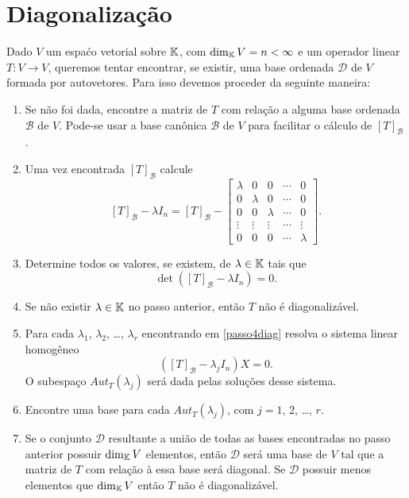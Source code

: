 \section{Diagonaliza\c{c}ão}
Dado $V$ um espaćo vetorial sobre $\mathbb{K}$, com $\dim_{\mathbb{K}} V = n < \infty$ e um operador linear $T \colon V \to V$, queremos tentar encontrar, se existir, uma base ordenada $\mathcal{D}$ de $V$ formada por autovetores. Para isso devemos proceder da seguinte maneira:
\begin{enumerate}
    \item Se não foi dada, encontre a matriz de $T$ com rela\c{c}ão a alguma base ordenada $\mathcal{B}$ de $V$. Pode-se usar a base canônica $\mathcal{B}$ de $V$ para facilitar o cálculo de $[T]_\mathcal{B}$.

    \item Uma vez encontrada $[T]_\mathcal{B}$ calcule
        \[
            [T]_\mathcal{B} - \lambda I_n = [T]_\mathcal{B} - \begin{bmatrix}\lambda & 0 & 0 & \cdots & 0\\0 & \lambda & 0 & \cdots & 0\\0 & 0 & \lambda & \cdots & 0\\\vdots & \vdots & \vdots & \cdots & \vdots\\0 & 0 & 0 & \cdots & \lambda\end{bmatrix}.
        \]

    \item\label{passo4diag} Determine todos os valores, se existem, de $\lambda \in \mathbb{K}$ tais que
        \[
            \det([T]_\mathcal{B} - \lambda I_n) = 0.
        \]

    \item Se não existir $\lambda \in \mathbb{K}$ no passo anterior, então $T$ não é diagonalizável.

    \item Para cada $\lambda_1$, $\lambda_2$, \dots, $\lambda_r$ encontrando em \eqref{passo4diag} resolva o sistema linear homogêneo
        \[
            ([T]_\mathcal{B} - \lambda_jI_n)X = 0.
        \]
        O subespa\c{c}o $Aut_T(\lambda_j)$ será dada pelas solu\c{c}ões desse sistema.

    \item Encontre uma base para cada $Aut_T(\lambda_j)$, com $j = 1$, 2, \dots, $r$.

    \item Se o conjunto $\mathcal{D}$ resultante a união de todas as bases encontradas no passo anterior possuir $\dim_{\mathbb{K}}V$ elementos, então $\mathcal{D}$ será uma base de $V$ tal que a matriz de $T$ com rela\c{c}ão à essa base será diagonal. Se $\mathcal{D}$ possuir menos elementos que $\dim_{\mathbb{K}}V$ então $T$ não é diagonalizável.
\end{enumerate}

